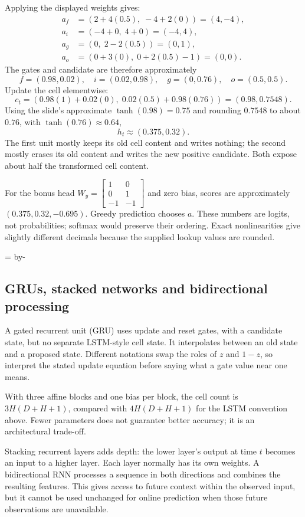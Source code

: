 \documentclass[11pt]{article}
\newcommand{\newsubsection}[1]{\par\begingroup\skip0=\pagegoal\advance\skip0 by-\pagetotal\ifdim\skip0<12\baselineskip\newpage\fi\endgroup\subsection{#1}}
\begin{document}
Applying the displayed weights gives:
\[
\begin{aligned}
a_f&=(2+4(0.5),\;-4+2(0))=(4,-4),\\
a_i&=(-4+0,\;4+0)=(-4,4),\\
a_g&=(0,\;2-2(0.5))=(0,1),\\
a_o&=(0+3(0),\;0+2(0.5)-1)=(0,0).
\end{aligned}
\]
The gates and candidate are therefore approximately
\[
f=(0.98,0.02),\quad i=(0.02,0.98),\quad
g=(0,0.76),\quad o=(0.5,0.5).
\]
Update the cell elementwise:
\[
c_t=(0.98(1)+0.02(0),\;0.02(0.5)+0.98(0.76))
     =(0.98,0.7548).
\]
Using the slide's approximate $\tanh(0.98)=0.75$ and rounding $0.7548$ to about $0.76$, with $\tanh(0.76)\approx0.64$,
\[
h_t\approx(0.375,0.32).
\]
The first unit mostly keeps its old cell content and writes nothing; the second mostly erases its old content and writes the new positive candidate. Both expose about half the transformed cell content.

For the bonus head
$W_y=\left[\begin{smallmatrix}1&0\\0&1\\-1&-1\end{smallmatrix}\right]$
and zero bias, scores are approximately $(0.375,0.32,-0.695)$. Greedy prediction chooses $a$. These numbers are logits, not probabilities; softmax would preserve their ordering. Exact nonlinearities give slightly different decimals because the supplied lookup values are rounded.

\newsubsection{GRUs, stacked networks and bidirectional processing}
A gated recurrent unit (GRU) uses update and reset gates, with a candidate state, but no separate LSTM-style cell state. It interpolates between an old state and a proposed state. Different notations swap the roles of $z$ and $1-z$, so interpret the stated update equation before saying what a gate value near one means.

With three affine blocks and one bias per block, the cell count is $3H(D+H+1)$, compared with $4H(D+H+1)$ for the LSTM convention above. Fewer parameters does not guarantee better accuracy; it is an architectural trade-off.

Stacking recurrent layers adds depth: the lower layer's output at time $t$ becomes an input to a higher layer. Each layer normally has its own weights. A bidirectional RNN processes a sequence in both directions and combines the resulting features. This gives access to future context within the observed input, but it cannot be used unchanged for online prediction when those future observations are unavailable.
\end{document}
